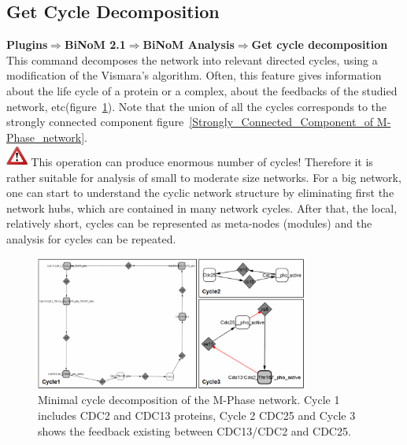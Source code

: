 \subsection{Get Cycle Decomposition}
\textbf{Plugins$\Rightarrow$BiNoM 2.1$\Rightarrow$BiNoM Analysis$\Rightarrow$Get cycle decomposition}\\
This command decomposes the network into relevant directed cycles\cite{gleiss2001relevant}, using a modification of the Vismara’s algorithm\cite{vismara1997union}. Often, this feature gives information about the life cycle of a protein or a complex, about the feedbacks of the studied network, etc(figure~\ref{Minimal_cycle_decomposition_of_the M-Phase}). Note that the union of all the cycles corresponds to the strongly connected component figure~\ref{Strongly_Connected_Component_of M-Phase_network}.\\
\includegraphics[width=20pt,height=20pt]{graphics/warning} This operation can produce enormous number of cycles! Therefore it is rather suitable for analysis of small to moderate size networks. For a big network, one can start to understand the cyclic network structure by eliminating first the network hubs, which are contained in many network cycles. After that, the local, relatively short, cycles can be represented as meta-nodes (modules) and the analysis for cycles can be repeated.\\
\begin{figure}
\centering
\includegraphics[width=0.8\textwidth]{graphics/Minimal_cycle_decomposition_of_the_M-Phase}
\caption{Minimal cycle decomposition of the M-Phase network.  Cycle 1 includes CDC2 and CDC13 proteins, Cycle 2 CDC25 and Cycle 3 shows the feedback existing between CDC13/CDC2 and CDC25.}
\label{Minimal_cycle_decomposition_of_the M-Phase}
\end{figure}

